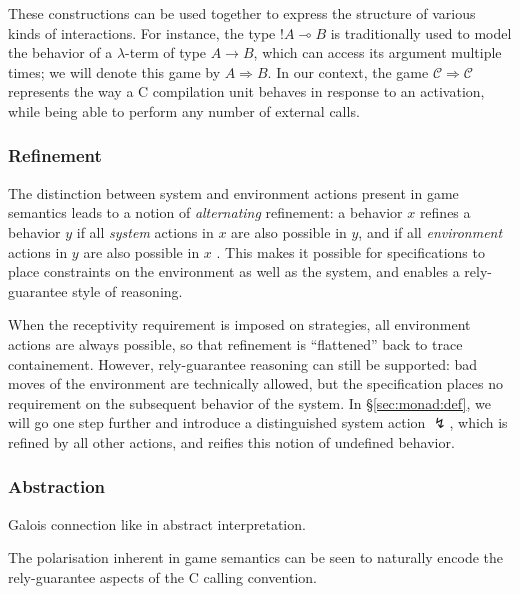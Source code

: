\documentclass[acmsmall,timestamp,review]{acmart}
\begin{document}
These constructions can be used together
to express the structure of various kinds of interactions.
For instance,
the type $!A \multimap B$ is traditionally used
to model the behavior of a $\lambda$-term of type $A \rightarrow B$,
which can access its argument multiple times;
we will denote this game by $A \Rightarrow B$.
In our context,
the game $\mathcal{C} \Rightarrow \mathcal{C}$
represents the way a C compilation unit behaves in response to
an activation,
while being able to perform any number of external calls.


\subsubsection{Refinement} %

The distinction between system and environment actions
present in game semantics
leads to a notion of \emph{alternating} refinement:
a behavior $x$ refines a behavior $y$ if
all \emph{system} actions in $x$ are also possible in $y$, and if
all \emph{environment} actions in $y$ are also possible in $x$
\cite{altref,alfaro}.
This makes it possible for specifications to
place constraints on the environment as well as the system,
and enables a rely-guarantee style of reasoning.

When the receptivity requirement is imposed on strategies,
all environment actions are always possible,
so that refinement is ``flattened'' back to trace containement.
However,
rely-guarantee reasoning can still be supported:
bad moves of the environment are technically allowed,
but the specification places no requirement on
the subsequent behavior of the system.
In \S\ref{sec:monad:def},
we will go one step further and introduce a distinguished
system action $\lightning$,
which is refined by all other actions,
and reifies this notion of undefined behavior.


\subsubsection{Abstraction} %

Galois connection like in abstract interpretation.

The polarisation inherent in game semantics
can be seen to naturally encode the rely-guarantee aspects
of the C calling convention.


\end{document}
